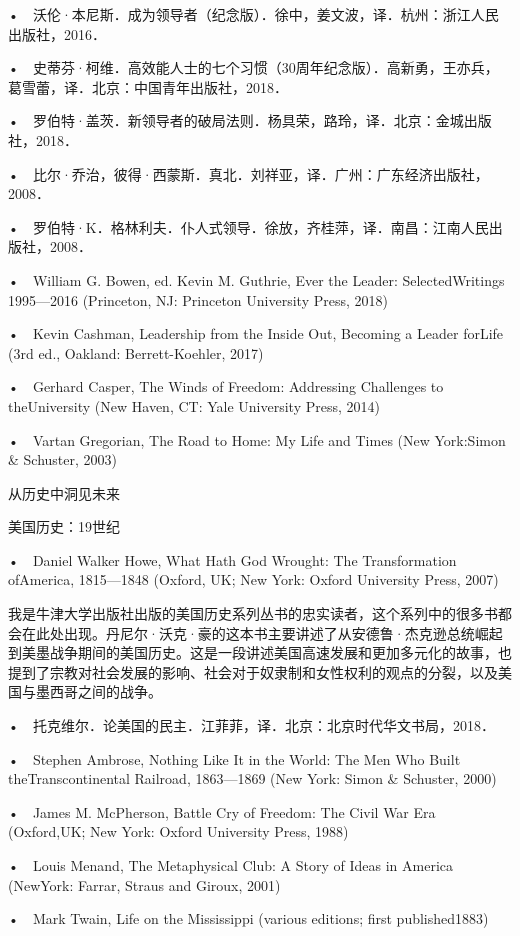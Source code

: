 •　沃伦·本尼斯．成为领导者（纪念版）．徐中，姜文波，译．杭州：浙江人民出版社，2016．

•　史蒂芬·柯维．高效能人士的七个习惯（30周年纪念版）．高新勇，王亦兵，葛雪蕾，译．北京：中国青年出版社，2018．

•　罗伯特·盖茨．新领导者的破局法则．杨具荣，路玲，译．北京：金城出版社，2018．


•　比尔·乔治，彼得·西蒙斯．真北．刘祥亚，译．广州：广东经济出版社，2008．

•　罗伯特·K．格林利夫．仆人式领导．徐放，齐桂萍，译．南昌：江南人民出版社，2008．

•　William G. Bowen, ed. Kevin M. Guthrie, Ever the Leader: SelectedWritings 1995—2016 (Princeton, NJ: Princeton University Press, 2018)

•　Kevin Cashman, Leadership from the Inside Out, Becoming a Leader forLife (3rd ed., Oakland: Berrett-Koehler, 2017)

•　Gerhard Casper, The Winds of Freedom: Addressing Challenges to theUniversity (New Haven, CT: Yale University Press, 2014)

•　Vartan Gregorian, The Road to Home: My Life and Times (New York:Simon \& Schuster, 2003)


从历史中洞见未来

美国历史：19世纪

•　Daniel Walker Howe, What Hath God Wrought: The Transformation ofAmerica, 1815—1848 (Oxford, UK; New York: Oxford University Press, 2007)

我是牛津大学出版社出版的美国历史系列丛书的忠实读者，这个系列中的很多书都会在此处出现。丹尼尔·沃克·豪的这本书主要讲述了从安德鲁·杰克逊总统崛起到美墨战争期间的美国历史。这是一段讲述美国高速发展和更加多元化的故事，也提到了宗教对社会发展的影响、社会对于奴隶制和女性权利的观点的分裂，以及美国与墨西哥之间的战争。


•　托克维尔．论美国的民主．江菲菲，译．北京：北京时代华文书局，2018．

•　Stephen Ambrose, Nothing Like It in the World: The Men Who Built theTranscontinental Railroad, 1863—1869 (New York: Simon \& Schuster, 2000)

•　James M. McPherson, Battle Cry of Freedom: The Civil War Era (Oxford,UK; New York: Oxford University Press, 1988)


•　Louis Menand, The Metaphysical Club: A Story of Ideas in America (NewYork: Farrar, Straus and Giroux, 2001)

•　Mark Twain, Life on the Mississippi (various editions; first published1883)

